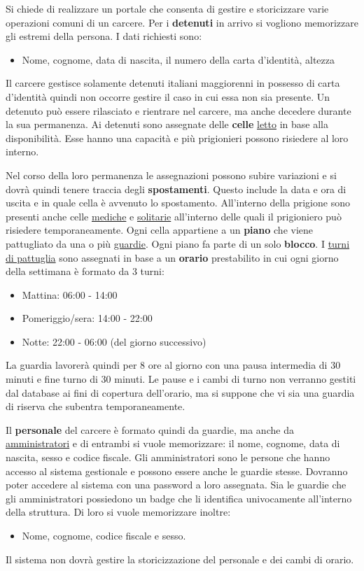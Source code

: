 \documentclass[a4paper,12pt]{report}
\begin{document}
\begin{linenumbers}
\modulolinenumbers[5]
Si chiede di realizzare un portale che consenta di gestire e storicizzare varie operazioni comuni di un carcere. Per i \textbf{detenuti} in arrivo si vogliono memorizzare gli estremi della persona.
%
I dati richiesti sono:
\begin{itemize}
    \item Nome, cognome, data di nascita, il numero della carta d'identità, altezza
\end{itemize}
Il carcere gestisce solamente detenuti italiani maggiorenni in possesso di carta d'identità quindi non occorre gestire il caso in cui essa non sia presente.
%
Un detenuto può essere rilasciato e rientrare nel carcere, ma anche decedere durante la sua permanenza.
%
Ai detenuti sono assegnate delle \textbf{celle} \underline{letto} in base alla disponibilità.
%
Esse hanno una capacità e più prigionieri possono risiedere al loro interno.
%
\par
Nel corso della loro permanenza le assegnazioni possono subire variazioni e si dovrà quindi tenere traccia degli \textbf{spostamenti}.
%
Questo include la data e ora di uscita e in quale cella è avvenuto lo spostamento.
%
All'interno della prigione sono presenti anche celle \underline{mediche} e \underline{solitarie} all'interno delle quali il prigioniero può risiedere temporaneamente.
%
Ogni cella appartiene a un \textbf{piano} che viene pattugliato da una o più \underline{guardie}.
%
Ogni piano fa parte di un solo \textbf{blocco}.
%
I \underline{turni di pattuglia} sono assegnati in base a un \textbf{orario} prestabilito in cui ogni giorno della settimana è formato da 3 turni:
\begin{itemize}
    \item Mattina: 06:00 - 14:00
    \item Pomeriggio/sera: 14:00 - 22:00
    \item Notte: 22:00 - 06:00 (del giorno successivo)
\end{itemize}   
La guardia lavorerà quindi per 8 ore al giorno con una pausa intermedia di 30 minuti e fine turno di 30 minuti.
%
Le pause e i cambi di turno non verranno gestiti dal database ai fini di copertura dell'orario, ma si suppone che vi sia una guardia di riserva che subentra temporaneamente.
%
\par Il \textbf{personale} del carcere è formato quindi da guardie, ma anche da \underline{amministratori} e di entrambi si vuole memorizzare: il nome, cognome, data di nascita, sesso e codice fiscale.
%
Gli amministratori sono le persone che hanno accesso al sistema gestionale e possono essere anche le guardie stesse.
%
Dovranno poter accedere al sistema con una password a loro assegnata.
%
Sia le guardie che gli amministratori possiedono un badge che li identifica univocamente all'interno della struttura.
%
Di loro si vuole memorizzare inoltre:
\begin{itemize}
    \item Nome, cognome, codice fiscale e sesso.
\end{itemize}
Il sistema non dovrà gestire la storicizzazione del personale e dei cambi di orario.
\end{linenumbers}
\end{document}
